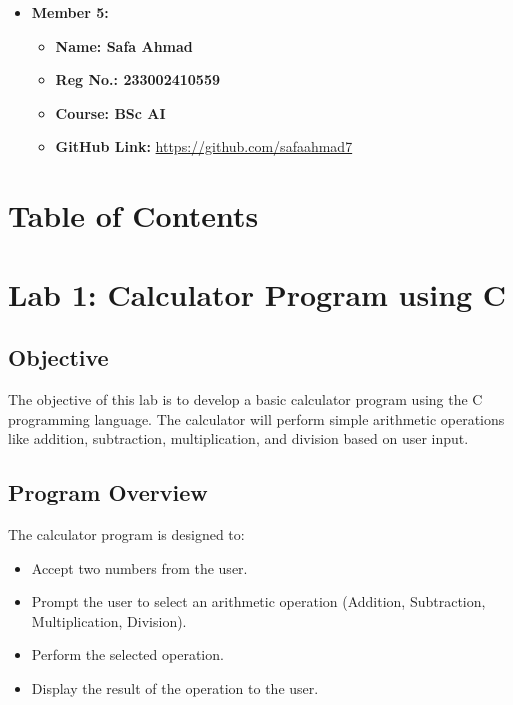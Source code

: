 \documentclass[a4paper,12pt]{article}
\begin{document}
\begin{itemize}[leftmargin=1.5cm]
    \item \textbf{Member 5:} 
    \begin{itemize}[leftmargin=1.5cm]
        \item \textbf{Name: Safa Ahmad} 
        \item \textbf{Reg No.: 233002410559} 
        \item \textbf{Course: BSc AI} 
        \item \textbf{GitHub Link:} \url{https://github.com/safaahmad7}
    \end{itemize}
\end{itemize}

\vspace{1cm}

\section*{Table of Contents}
\tableofcontents

\vspace{1cm}

\newpage

\section{Lab 1: Calculator Program using C}

\subsection{Objective}
The objective of this lab is to develop a basic calculator program using the C programming language. The calculator will perform simple arithmetic operations like addition, subtraction, multiplication, and division based on user input.

\subsection{Program Overview}
The calculator program is designed to:
\begin{itemize}
    \item Accept two numbers from the user.
    \item Prompt the user to select an arithmetic operation (Addition, Subtraction, Multiplication, Division).
    \item Perform the selected operation.
    \item Display the result of the operation to the user.
\end{itemize}
\end{document}
